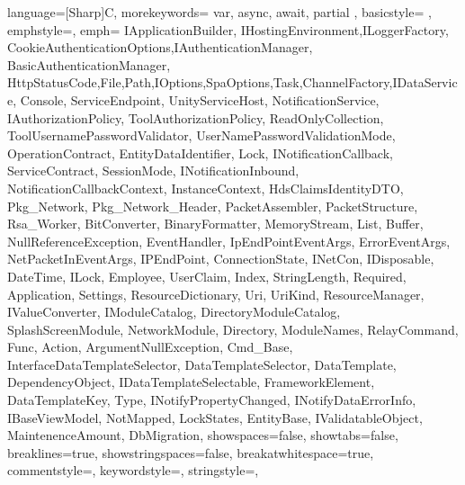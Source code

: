 {
	language=[Sharp]C,
	morekeywords={ var, async, await, partial }, %
	basicstyle=\ttfamily \color{black} \small \smaller,
	emphstyle={\color{vs_class}},
	emph={ IApplicationBuilder, IHostingEnvironment,ILoggerFactory, CookieAuthenticationOptions,IAuthenticationManager, BasicAuthenticationManager, HttpStatusCode,File,Path,IOptions,SpaOptions,Task,ChannelFactory,IDataService, Console, ServiceEndpoint, UnityServiceHost, NotificationService, IAuthorizationPolicy, ToolAuthorizationPolicy, ReadOnlyCollection, ToolUsernamePasswordValidator, UserNamePasswordValidationMode, OperationContract, EntityDataIdentifier, Lock, INotificationCallback, ServiceContract, SessionMode, INotificationInbound, NotificationCallbackContext, InstanceContext, HdsClaimsIdentityDTO, Pkg_Network, Pkg_Network_Header, PacketAssembler, PacketStructure, Rsa_Worker, BitConverter, BinaryFormatter, MemoryStream, List, Buffer, NullReferenceException, EventHandler, IpEndPointEventArgs, ErrorEventArgs, NetPacketInEventArgs, IPEndPoint, ConnectionState, INetCon, IDisposable, DateTime, ILock, Employee, UserClaim, Index, StringLength, Required, Application, Settings, ResourceDictionary, Uri, UriKind, ResourceManager, IValueConverter, IModuleCatalog, DirectoryModuleCatalog, SplashScreenModule, NetworkModule, Directory, ModuleNames, RelayCommand, Func, Action, ArgumentNullException, Cmd_Base, InterfaceDataTemplateSelector, DataTemplateSelector, DataTemplate, DependencyObject, IDataTemplateSelectable, FrameworkElement, DataTemplateKey, Type, INotifyPropertyChanged, INotifyDataErrorInfo, IBaseViewModel, NotMapped, LockStates, EntityBase, IValidatableObject, MaintenenceAmount, DbMigration}, %
	showspaces=false,
	showtabs=false,
	breaklines=true,
	showstringspaces=false,
	breakatwhitespace=true,
	commentstyle=\color{vs_comment},
	keywordstyle=\color{vs_keyword},
	stringstyle=\color{vs_string},
}


